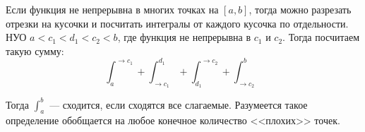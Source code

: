 \begin{notice}
    Если функция не непрерывна в многих точках на $[a, b]$, тогда можно разрезать отрезки на кусочки и посчитать интегралы от каждого кусочка по отдельности. НУО $a < c_1 < d_1 < c_2 < b$, где функция не непрерывна в $c_1$ и $c_2$. Тогда посчитаем такую сумму:
    \begin{equation*}
        \int_{a}^{\to c_1} + \int_{\to c_1}^{d_1} + \int_{d_1}^{\to c_2} + \int_{\to c_2}^{b}
    \end{equation*}

    Тогда $\int_{a}^{b}$ --- сходится, если сходятся все слагаемые. Разумеется такое определение обобщается на любое конечное количество <<плохих>> точек.
\end{notice}
